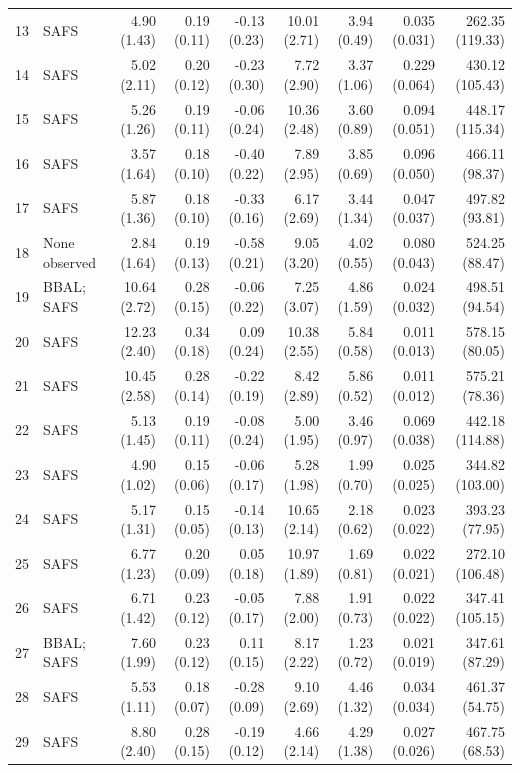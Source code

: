 \begin{table}[htbp]
{\begin{tabular}{rlrrrrrrr}
13 & SAFS & 4.90 (1.43) & 0.19 (0.11) & -0.13 (0.23) & 10.01 (2.71) & 3.94 (0.49) & 0.035 (0.031) & 262.35 (119.33) \\
14 & SAFS & 5.02 (2.11) & 0.20 (0.12) & -0.23 (0.30) & 7.72 (2.90) & 3.37 (1.06) & 0.229 (0.064) & 430.12 (105.43) \\
15 & SAFS & 5.26 (1.26) & 0.19 (0.11) & -0.06 (0.24) & 10.36 (2.48) & 3.60 (0.89) & 0.094 (0.051) & 448.17 (115.34) \\
16 & SAFS & 3.57 (1.64) & 0.18 (0.10) & -0.40 (0.22) & 7.89 (2.95) & 3.85 (0.69) & 0.096 (0.050) & 466.11 (98.37) \\
17 & SAFS & 5.87 (1.36) & 0.18 (0.10) & -0.33 (0.16) & 6.17 (2.69) & 3.44 (1.34) & 0.047 (0.037) & 497.82 (93.81) \\
18 & None observed & 2.84 (1.64) & 0.19 (0.13) & -0.58 (0.21) & 9.05 (3.20) & 4.02 (0.55) & 0.080 (0.043) & 524.25 (88.47) \\
19 & BBAL; SAFS & 10.64 (2.72) & 0.28 (0.15) & -0.06 (0.22) & 7.25 (3.07) & 4.86 (1.59) & 0.024 (0.032) & 498.51 (94.54) \\
20 & SAFS & 12.23 (2.40) & 0.34 (0.18) & 0.09 (0.24) & 10.38 (2.55) & 5.84 (0.58) & 0.011 (0.013) & 578.15 (80.05) \\
21 & SAFS & 10.45 (2.58) & 0.28 (0.14) & -0.22 (0.19) & 8.42 (2.89) & 5.86 (0.52) & 0.011 (0.012) & 575.21 (78.36) \\
22 & SAFS & 5.13 (1.45) & 0.19 (0.11) & -0.08 (0.24) & 5.00 (1.95) & 3.46 (0.97) & 0.069 (0.038) & 442.18 (114.88) \\
23 & SAFS & 4.90 (1.02) & 0.15 (0.06) & -0.06 (0.17) & 5.28 (1.98) & 1.99 (0.70) & 0.025 (0.025) & 344.82 (103.00) \\
24 & SAFS & 5.17 (1.31) & 0.15 (0.05) & -0.14 (0.13) & 10.65 (2.14) & 2.18 (0.62) & 0.023 (0.022) & 393.23 (77.95) \\
25 & SAFS & 6.77 (1.23) & 0.20 (0.09) & 0.05 (0.18) & 10.97 (1.89) & 1.69 (0.81) & 0.022 (0.021) & 272.10 (106.48) \\
26 & SAFS & 6.71 (1.42) & 0.23 (0.12) & -0.05 (0.17) & 7.88 (2.00) & 1.91 (0.73) & 0.022 (0.022) & 347.41 (105.15) \\
27 & BBAL; SAFS & 7.60 (1.99) & 0.23 (0.12) & 0.11 (0.15) & 8.17 (2.22) & 1.23 (0.72) & 0.021 (0.019) & 347.61 (87.29) \\
28 & SAFS & 5.53 (1.11) & 0.18 (0.07) & -0.28 (0.09) & 9.10 (2.69) & 4.46 (1.32) & 0.034 (0.034) & 461.37 (54.75) \\
29 & SAFS & 8.80 (2.40) & 0.28 (0.15) & -0.19 (0.12) & 4.66 (2.14) & 4.29 (1.38) & 0.027 (0.026) & 467.75 (68.53) \\
\hline
\end{tabular}%
}
\end{table}
